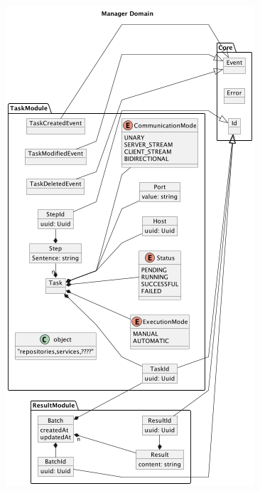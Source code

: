 \begin{figure}[H]
    \centering
    \includegraphics[height=0.4\textheight]{./part/Proyecto_ejecutivo/memoria_descriptiva/descripcionDelProyecto/manager/uml/managerDomain}
    \caption[Diagrama de objetos de dominio]{}\label{fig:managerDomain}
\end{figure}

